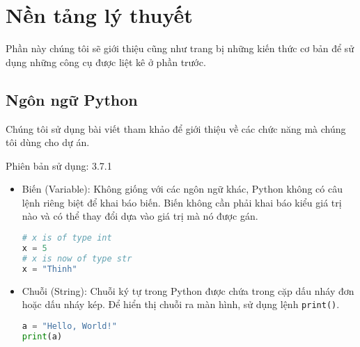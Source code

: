 \chapter{Nền tảng lý thuyết}
Phần này chúng tôi sẽ giới thiệu cũng như trang bị những kiến thức cơ bản để sử dụng những công cụ được liệt kê ở phần trước.
\section{Ngôn ngữ Python}
Chúng tôi sử dụng bài viết tham khảo\cite{python} để giới thiệu về các chức năng mà chúng tôi dùng cho dự án.
\par
Phiên bản sử dụng: 3.7.1
\begin{itemize}
	\item Biến (Variable): Không giống với các ngôn ngữ khác, Python không có câu lệnh riêng biệt để khai báo biến. Biến không cần phải khai báo kiểu giá trị nào và có thể thay đổi dựa vào giá trị mà nó được gán.
	\begin{lstlisting}[language=Python]
# x is of type int
x = 5
# x is now of type str
x = "Thinh"
	\end{lstlisting}
	\item Chuỗi (String): Chuỗi ký tự trong Python được chứa trong cặp dấu nháy đơn hoặc dấu nháy kép. Để hiển thị chuỗi ra màn hình, sử dụng lệnh \texttt{print()}.
	\begin{lstlisting}[language=Python]
a = "Hello, World!"
print(a)


\end{lstlisting}
\end{itemize}
